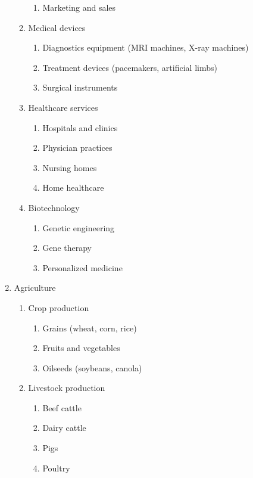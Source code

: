 \begin{enumerate}
\begin{enumerate}
\begin{enumerate}
            \item Marketing and sales
        \end{enumerate}
        \item Medical devices
        \begin{enumerate}
            \item Diagnostics equipment (MRI machines, X-ray machines)
            \item Treatment devices (pacemakers, artificial limbs)
            \item Surgical instruments
        \end{enumerate}
        \item Healthcare services
        \begin{enumerate}
            \item Hospitals and clinics
            \item Physician practices
            \item Nursing homes
            \item Home healthcare
        \end{enumerate}
        \item Biotechnology
        \begin{enumerate}
            \item Genetic engineering
            \item Gene therapy
            \item Personalized medicine
        \end{enumerate}
    \end{enumerate}
    \item Agriculture
    \begin{enumerate}
        \item Crop production
        \begin{enumerate}
            \item Grains (wheat, corn, rice)
            \item Fruits and vegetables
            \item Oilseeds (soybeans, canola)
        \end{enumerate}
        \item Livestock production
        \begin{enumerate}
            \item Beef cattle
            \item Dairy cattle
            \item Pigs
            \item Poultry

\end{enumerate}
\end{enumerate}
\end{enumerate}
